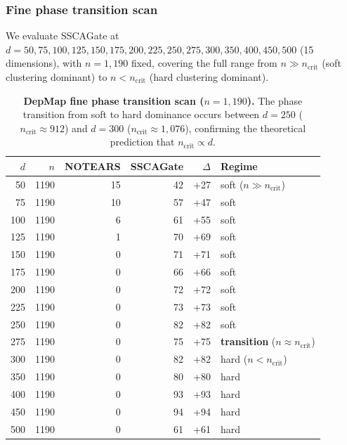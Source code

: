 \documentclass[12pt,a4paper]{article}
\begin{document}
\subsubsection*{Fine phase transition scan}

We evaluate SSCAGate at $d = 50, 75, 100, 125, 150, 175, 200, 225, 250, 275, 300, 350, 400, 450, 500$ (15 dimensions),
with $n = 1{,}190$ fixed, covering the full range from
$n \gg n_{\text{crit}}$ (soft clustering dominant) to
$n < n_{\text{crit}}$ (hard clustering dominant).

\begin{table}[htbp]
\centering
\caption{\textbf{DepMap fine phase transition scan ($n = 1{,}190$).}
The phase transition from soft to hard dominance occurs between
$d = 250$ ($n_{\text{crit}} \approx 912$) and $d = 300$
($n_{\text{crit}} \approx 1{,}076$), confirming the theoretical
prediction that $n_{\text{crit}} \propto d$.}
\label{tab:depmap_phase}
\begin{tabular}{rrrrrl}
\toprule
$d$ & $n$ & NOTEARS & SSCAGate & $\Delta$ & Regime \\
\midrule
50  & 1190 & 15 & 42  & +27  & soft ($n \gg n_{\text{crit}}$) \\
75  & 1190 & 10 & 57  & +47  & soft \\
100 & 1190 & 6  & 61  & +55  & soft \\
125 & 1190 & 1  & 70  & +69  & soft \\
150 & 1190 & 0  & 71  & +71  & soft \\
175 & 1190 & 0  & 66  & +66  & soft \\
200 & 1190 & 0  & 72  & +72  & soft \\
225 & 1190 & 0  & 73  & +73  & soft \\
250 & 1190 & 0  & 82  & +82  & soft \\
275 & 1190 & 0  & 75  & +75  & \textbf{transition} ($n \approx n_{\text{crit}}$) \\
300 & 1190 & 0  & 82  & +82  & hard ($n < n_{\text{crit}}$) \\
350 & 1190 & 0  & 80  & +80  & hard \\
400 & 1190 & 0  & 93  & +93  & hard \\
450 & 1190 & 0  & 94  & +94  & hard \\
500 & 1190 & 0  & 61  & +61  & hard \\
\bottomrule
\end{tabular}
\end{table}
\end{document}
